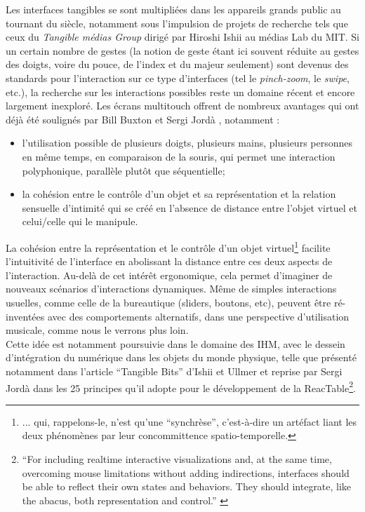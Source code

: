 \indent Les interfaces tangibles se sont multipliées dans les appareils grands public au tournant du siècle, notamment sous l'impulsion de projets de recherche tels que ceux du \textit{Tangible médias Group} dirigé par Hiroshi Ishii au médias Lab du \gls{MIT}. Si un certain nombre de gestes (la notion de geste étant ici souvent réduite au gestes des doigts, voire du pouce, de l'index et du majeur seulement) sont devenus des standards pour l'interaction sur ce type d'interfaces (tel le \textit{pinch-zoom}, le \textit{swipe}, etc.), la recherche sur les interactions possibles reste un domaine récent et encore largement inexploré. Les écrans multitouch offrent de nombreux avantages qui ont déjà été soulignés par Bill Buxton \cite{buxton_multi-touch_2007} et Sergi Jordà \cite{jorda_digital_2005}, notamment :
\vspace{-1em}
\begin{itemize}[noitemsep]
	\item l'utilisation possible de plusieurs doigts, plusieurs mains, plusieurs personnes en même temps, en comparaison de la souris, qui permet une interaction polyphonique, parallèle plutôt que séquentielle;
	\item la cohésion entre le contrôle d'un objet et sa représentation et la relation sensuelle d'intimité qui se créé en l'absence de distance entre l'objet virtuel et celui/celle qui le manipule.
\end{itemize}
\noindent La cohésion entre la représentation et le contrôle d'un objet virtuel\footnote{... qui, rappelons-le, n'est qu'une ``synchrèse'', c'est-à-dire un artéfact liant les deux phénomènes par leur concommittence spatio-temporelle.} facilite l'intuitivité de l'interface en abolissant la distance entre ces deux aspects de l'interaction. Au-delà de cet intérêt ergonomique, cela permet d'imaginer de nouveaux scénarios d'interactions dynamiques. Même de simples interactions usuelles, comme celle de la bureautique (sliders, boutons, etc), peuvent être ré-inventées avec des comportements alternatifs, dans une perspective d'utilisation musicale, comme nous le verrons plus loin.\\
\indent Cette idée est notamment poursuivie dans le domaine des \gls{IHM}, avec le dessein d'intégration du numérique dans les objets du monde physique, telle que présenté notamment dans l'article ``Tangible Bits'' d'Ishii et Ullmer \cite{ishii_tangible_1997} et reprise par Sergi Jordà dans les 25 principes qu'il adopte pour le développement de la ReacTable\footnote{``For including realtime interactive visualizations and, at the same time, overcoming mouse limitations without adding indirections, interfaces should be able to reflect their own states and behaviors. They should integrate, like the abacus, both representation and control.'' \cite{jorda_digital_2005}}.\\
